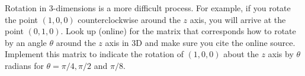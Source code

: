 {Rotation in 3-dimensions is a more difficult process.  For example, if you rotate the point $(1,0,0)$ counterclockwise around the $z$ axis, you will arrive at the point $(0,1,0)$.  Look up (online) for the matrix that corresponds how to rotate by an angle $\theta$ around the $z$ axis in 3D and make sure you cite the online source.  Implement this matrix to indicate the rotation of $(1,0,0)$ about the $z$ axis by $\theta$ radians for $\theta=\pi/4, \pi/2$ and $\pi/8$. }
{}
